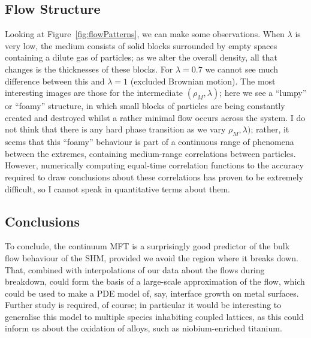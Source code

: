\subsection{Flow Structure}
Looking at Figure~\ref{fig:flowPatterns}, we can make some observations. When $\lambda$ is very low, the medium consists of solid blocks surrounded by empty spaces containing a dilute gas of particles; as we alter the overall density, all that
changes is the thicknesses of these blocks. For $\lambda=0.7$ we cannot see much difference between this and $\lambda=1$ (excluded Brownian motion). The most interesting images are those for the intermediate $(\rho_M , \lambda)$; here
we see a ``lumpy'' or ``foamy'' structure, in which small blocks of particles are being constantly created and destroyed whilst a rather minimal flow occurs across the system.
I do not think that there is any hard phase transition as we vary $\rho_M , \lambda)$; rather, it seems that this ``foamy'' behaviour is part of a continuous range of phenomena between the extremes, containing medium-range correlations between
particles. However, numerically computing equal-time correlation functions to the accuracy required to draw conclusions about these correlations has proven to be extremely difficult, so I cannot speak in quantitative terms about them.
\subsection{Conclusions}
To conclude, the continuum MFT is a surprisingly good predictor of the bulk flow behaviour of the SHM, provided we avoid the region where it breaks down. That, combined with interpolations of our data about the flows during breakdown,
could form the basis of a large-scale approximation of the flow, which could be used to make a PDE model of, say, interface growth on metal surfaces. Further study is required, of course; in particular it would be interesting to generalise this
model to multiple species inhabiting coupled lattices, as this could inform us about the oxidation of alloys, such as niobium-enriched titanium.